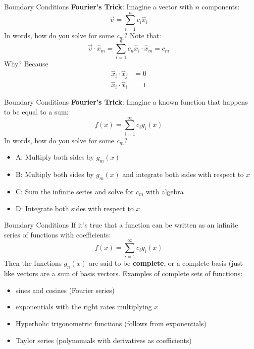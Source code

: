 \documentclass{beamer}
\begin{document}
\begin{frame}{Boundary Conditions}
\alert{\textbf{Fourier's Trick}}: Imagine a vector with $n$ components:
\begin{equation}
\vec{v} = \sum_{i = 1}^n c_i \hat{x}_i
\end{equation}
In words, how do you solve for some $c_m$? Note that:
\begin{equation}
\vec{v} \cdot \hat{x}_m = \sum_{i = 1}^n c_n \hat{x}_i \cdot \hat{x}_m = c_m
\end{equation}
Why?  Because
\begin{align}
\hat{x}_i \cdot \hat{x}_j &= 0 \\
\hat{x}_i \cdot \hat{x}_i &= 1
\end{align}
\end{frame}

\begin{frame}{Boundary Conditions}
\alert{\textbf{Fourier's Trick}}: Imagine a known function that happens to be equal to a sum:
\begin{equation}
f(x) = \sum_{i = 1}^{\infty} c_i g_i(x)
\end{equation}
In words, how do you solve for some $c_m$?
\begin{itemize}
\item A: Multiply both sides by $g_m(x)$
\item B: Multiply both sides by $g_m(x)$ and integrate both sides with respect to $x$
\item C: Sum the infinite series and solve for $c_m$ with algebra
\item D: Integrate both sides with respect to $x$
\end{itemize}
\end{frame}

\begin{frame}{Boundary Conditions}
If it's true that a function can be written as an infinite series of functions with coefficients:
\begin{equation}
f(x) = \sum_{i = 1}^{\infty} c_i g_i(x)
\end{equation}
Then the functions $g_n(x)$ are said to be \textbf{\alert{complete}}, or a complete basis (just like vectors are a sum of basis vectors. Examples of complete sets of functions:
\begin{itemize}
\item sines and cosines (Fourier series)
\item exponentials with the right rates multiplying $x$
\item Hyperbolic trigonometric functions (follows from exponentials)
\item Taylor series (polynomials with derivatives as coefficients)
\end{itemize}
\end{frame}
\end{document}

